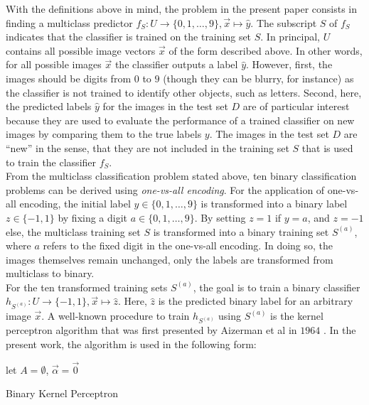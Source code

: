 With the definitions above in mind, the problem in the present paper consists in finding a multiclass predictor $f_S: U \rightarrow \{0, 1, \dots, 9\}, \vec{x} \mapsto \hat{y}$. The subscript $S$ of $f_S$ indicates that the classifier is trained on the training set $S$. In principal, $U$ contains all possible image vectors $\vec{x}$ of the form described above. In other words, for all possible images $\vec{x}$ the classifier outputs a label $\hat{y}$. However, first, the images should be digits from $0$ to $9$ (though they can be blurry, for instance) as the classifier is not trained to identify other objects, such as letters. Second, here, the predicted labels $\hat{y}$ for the images in the test set $D$ are of particular interest because they are used to evaluate the performance of a trained classifier on new images by comparing them to the true labels $y$. The images in the test set $D$ are \enquote{new} in the sense, that they are not included in the training set $S$ that is used to train the classifier $f_S$. \\

From the multiclass classification problem stated above, ten binary classification problems can be derived using \textit{one-vs-all encoding}. For the application of one-vs-all encoding, the initial label $y \in \{0, 1, \dots, 9\}$ is transformed into a binary label $z \in \{-1, 1\}$ by fixing a digit $a \in \{0, 1, \dots, 9\}$. By setting $z = 1$ if $y = a$, and $z = -1$ else, the multiclass training set $S$ is transformed into a binary training set $S^{(a)}$, where $a$ refers to the fixed digit in the one-vs-all encoding. In doing so, the images themselves remain unchanged, only the labels are transformed from multiclass to binary.\\

For the ten transformed training sets $S^{(a)}$, the goal is to train a binary classifier $h_{S^{(a)}}: U \rightarrow \{-1, 1\}, \vec{x} \mapsto \hat{z}$. Here, $\hat{z}$ is the predicted binary label for an arbitrary image $\vec{x}$. A well-known procedure to train $h_{S^{(a)}}$ using $S^{(a)}$ is the kernel perceptron algorithm that was first presented by Aizerman et al in $1964$ \cite{kernel1964}. In the present work, the algorithm is used in the following form:

\begin{algorithm}[H]
\SetAlgoLined
{}
 let $A = \emptyset$, $\vec{\alpha} = \vec{0}$\;
\caption{Binary Kernel Perceptron}
\end{algorithm}

